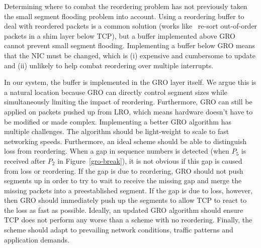 Determining where to combat the reordering problem has not previously taken the small segment flooding problem into account.  Using a reordering buffer to deal with reordered packets is a common solution (\eg{}works like~\cite{drb} re-sort out-of-order packets in a shim layer below TCP), but a buffer implemented above GRO cannot prevent small segment flooding.  Implementing a buffer below GRO means that the NIC must be changed, which is (i) expensive and cumbersome to update and (ii) unlikely to help combat reordering over multiple interrupts.

In our system, the buffer is implemented in the GRO layer itself.  We argue this is a natural location because GRO can
directly control segment sizes while simultaneously limiting the impact of reordering. 
Furthermore, GRO can still be applied on packets pushed up from LRO, which means hardware doesn't have to be modified
or made complex.
Implementing a better GRO algorithm has multiple challenges. The algorithm should be light-weight to scale to fast networking speeds. Furthermore, an ideal scheme should be able to distinguish loss from reordering.  When a gap in sequence numbers is detected (\eg{}when $P_5$ is received after $P_2$ in Figure~\ref{gro-break}), it is not obvious if this gap is caused from loss or reordering.  If the gap is due to reordering, GRO should not push segments up in order to try to wait to receive the missing gap and merge the missing packets into a preestablished segment.  If the gap is due to loss, however, then GRO should immediately push up the segments to allow TCP to react to the loss as fast as possible. Ideally, an updated GRO algorithm should ensure TCP does not perform any worse than a scheme with no reordering. Finally, the scheme should adapt to prevailing network conditions, traffic patterns and application demands.




